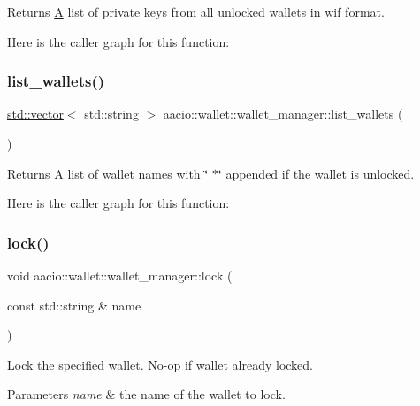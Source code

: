 \begin{DoxyReturn}{Returns}
\mbox{\hyperlink{struct_a}{A}} list of private keys from all unlocked wallets in wif format. 
\end{DoxyReturn}
Here is the caller graph for this function\+:
\mbox{\label{classaacio_1_1wallet_1_1wallet__manager_aeb011a9b1bce04ceb3c84c526b6f50ad}} 
\subsubsection{\texorpdfstring{list\+\_\+wallets()}{list\_wallets()}}
{\footnotesize\ttfamily \mbox{\hyperlink{classstd_1_1vector}{std\+::vector}}$<$ std\+::string $>$ aacio\+::wallet\+::wallet\+\_\+manager\+::list\+\_\+wallets (\begin{DoxyParamCaption}{ }\end{DoxyParamCaption})}

\begin{DoxyReturn}{Returns}
\mbox{\hyperlink{struct_a}{A}} list of wallet names with \char`\"{} $\ast$\char`\"{} appended if the wallet is unlocked. 
\end{DoxyReturn}
Here is the caller graph for this function\+:
\mbox{\label{classaacio_1_1wallet_1_1wallet__manager_aa42127c86142365f2bd51dc1232db9c8}} 
\subsubsection{\texorpdfstring{lock()}{lock()}}
{\footnotesize\ttfamily void aacio\+::wallet\+::wallet\+\_\+manager\+::lock (\begin{DoxyParamCaption}\item[{const std\+::string \&}]{name }\end{DoxyParamCaption})}

Lock the specified wallet. No-\/op if wallet already locked. 
\begin{DoxyParams}{Parameters}
{\em name} & the name of the wallet to lock. \\
\hline
\end{DoxyParams}

